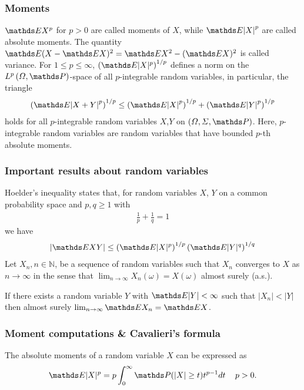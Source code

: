 \documentclass[a4paper, english, headtopline=0.08em, headsepline=0.04em, left = 1cm, right = 1cm, DIV=15]{article}
\begin{document}
\subsubsection*{Moments}
$\EE X^p$ for $p>0$ are called moments of $X$, while ${\EE|X|}^p$ are called absolute moments.
The quantity $\EE(X-\EE X)^2 = \EE X^2 - (\EE X)^2$ is called variance.
For $1\leq p \leq \infty$, $\left(\EE|X|^p\right)^{1/p}$ defines a norm on the $L^p\left(\Omega,\PP\right)$-space
of all $p$-integrable random variables, in particular, the triangle
\begin{align}\label{eq3_28}
\left(\EE {{|X+Y|}^p}\right)^{1/p} \leq  \left(\EE {{|X|}^p}\right)^{1/p} +  {\left(\EE {|Y|}^p\right)}^{1/p} 
\end{align} 
holds for all $p$-integrable random variables $X$,$Y$ on $\left(\Omega,\Sigma,\PP\right)$. Here, $p$-integrable random variables are random
variables that have bounded $p$-th absolute moments.
\subsubsection*{Important results about random variables}
Hoelder's inequality states that, for random variables $X$, $Y$
on a common probability space and $p,q\geq 1$  with
\begin{align*}
	\frac{1}{p} + \frac{1}{q} = 1
\end{align*}
we have 
\begin{align*}
	| \EE X Y | \leq \left(\EE |X|^{p}\right)^{1/p}\left(\EE |Y|^q \right)^{1/q}  
\end{align*}
Let $X_{n},n\in\mathbb{N}$, be a sequence of
random variables such that $X_n$ converges
to $X$ as $n \rightarrow \infty$ 
in the sense that $\lim_{n\rightarrow\infty}X_n(\omega) = X\left(\omega\right)$
almost surely (a.s.).
\begin{theorem}
	If there exists a random variable $Y$ with $\EE|Y| < \infty$ such that
	$|X_n|<|Y|$ then almost surely $\lim_{n\rightarrow \infty}\EE X_n = \EE X$.
\end{theorem}
\subsubsection*{Moment computations \& Cavalieri's formula}
\begin{proposition}
	\label{prop9.1} 
	The absolute moments of a random variable $X$ can be expressed as
\begin{align} \label{eq3_prop9.1}
\EE |X|^{p}=p\int_{0}^{\infty}\PP (|X|\geq t)t^{p-1} dt \,\quad p > 0.
\end{align}
\end{proposition}
\end{document}
